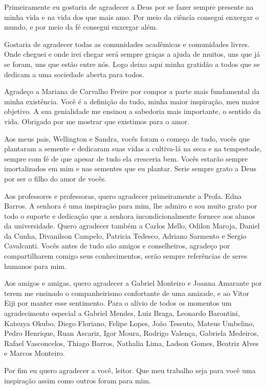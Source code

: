 \acknowledgements

Primeiramente eu gostaria de agradecer a Deus por se fazer sempre presente
na minha vida e na vida dos que mais amo. Por meio da ciência consegui enxergar
o mundo, e por meio da fé consegui enxergar além.

Gostaria de agradecer todas as comunidades acadêmicas e comunidades livres.
Onde cheguei e onde irei chegar será sempre graças a ajuda de muitos, uns
que já se foram, uns que estão entre nós. Logo deixo aqui minha gratidão
a todos que se dedicam a uma sociedade aberta para todos.

Agradeço a Mariana de Carvalho Freire por compor a parte mais fundamental
da minha existência. Você é a definição do tudo, minha maior inspiração,
meu maior objetivo. A sua genialidade me ensinou a sabedoria mais
importante, o sentido da vida. Obrigado por me mostrar que existimos
para o amor.

Aos meus pais, Wellington e Sandra, vocês foram o começo de tudo, vocês
que plantaram a semente e dedicaram suas vidas a cultiva-lá na seca e
na tempestade, sempre com fé de que apesar de tudo ela cresceria bem.
Vocês estarão sempre imortalizados em mim e nas sementes que eu plantar.
Serie sempre grato a Deus por ser o filho do amor de vocês.

Aos professores e professoras, quero agradecer primeiramente a Profa. Edna
Barros. A senhora é uma inspiração para mim, lhe admiro e sou muito grato
por todo o suporte e dedicação que a senhora incondicionalmente fornece aos
alunos da universidade. Quero agradecer também a Carlos Mello, Odilon Maroja,
Daniel da Cunha, Divanilson Campelo, Patricia Tedesco, Adriano Sarmento
e Sergio Cavalcanti. Vocês antes de tudo são amigos e conselheiros, agradeço
por compartilharem comigo seus conhecimentos, serão sempre referências de
seres humanos para mim.

Aos amigos e amigas, quero agradecer a Gabriel Monteiro e Joanna Amarante
por terem me ensinado o companheirismo confortante de uma amizade, e ao 
Vitor Eiji por manter esse sentimento. Para o alívio de todos os momentos
um agradecimento especial a Gabriel Mendes, Luiz Braga, Leonardo Barontini,
Katsuya Okubo, Diego Floriano, Felipe Lopes, João Tessuto, Mateus Umbelino,
Pedro Henrique, Ruan Ascariz, Igor Moura, Rodrigo Valença, Gabriela Medeiros,
Rafael Vasconcelos, Thiago Barros, Nathalia Lima, Ladson Gomes, Beatriz Alves
e Marcos Monteiro.

Por fim eu quero agradecer a você, leitor. Que meu trabalho seja para você
uma inspiração assim como outros foram para mim.